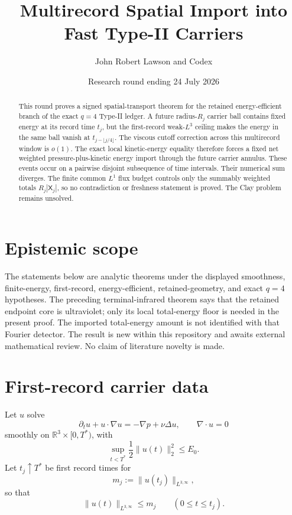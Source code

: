 \documentclass[11pt]{article}
\title{Multirecord Spatial Import into Fast Type-II Carriers}
\author{John Robert Lawson and Codex}
\date{Research round ending 24 July 2026}
\theoremstyle{remark}
\newcommand{\R}{\mathbb R}
\begin{document}
\maketitle

\begin{abstract}
This round proves a signed spatial-transport theorem for the retained
energy-efficient branch of the exact \(q=4\) Type-II ledger.  A future
radius-\(R_j\) carrier ball contains fixed energy at its record time
\(t_j\), but the first-record weak-\(L^3\) ceiling makes the energy in the
same ball vanish at
\(t_{j-\lfloor j/4\rfloor}\).  The viscous cutoff correction across this
multirecord window is \(o(1)\).  The exact local kinetic-energy equality
therefore forces a fixed net weighted pressure-plus-kinetic energy import
through the future carrier annulus.  These events occur on a pairwise
disjoint subsequence of time intervals.  Their numerical sum diverges.  The
finite common \(L^1\) flux budget controls only the summably weighted totals
\(R_j|\mathsf X_j|\), so no contradiction or freshness statement is proved.
The Clay problem remains unsolved.
\end{abstract}

\section{Epistemic scope}

The statements below are analytic theorems under the displayed
smoothness, finite-energy, first-record, energy-efficient, retained-geometry,
and exact \(q=4\) hypotheses.  The preceding terminal-infrared theorem says
that the retained endpoint core is ultraviolet; only its local total-energy
floor is needed in the present proof.  The imported total-energy amount is
not identified with that Fourier detector.  The result is new within this
repository and awaits external mathematical review.  No claim of literature
novelty is made.

\section{First-record carrier data}

Let \(u\) solve
\[
 \partial_tu+u\cdot\nabla u=-\nabla p+\nu\Delta u,
 \qquad
 \nabla\cdot u=0
\]
smoothly on \(\R^3\times[0,T^*)\), with
\[
 \sup_{t<T^*}\frac12\|u(t)\|_2^2\le E_0.
\]
Let \(t_j\uparrow T^*\) be first record times for
\[
 m_j:=\|u(t_j)\|_{L^{3,\infty}},
\]
so that
\[
 \|u(t)\|_{L^{3,\infty}}\le m_j
 \qquad(0\le t\le t_j).
\]
\end{document}
